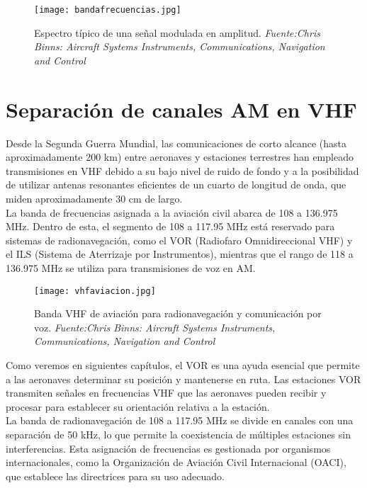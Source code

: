 \begin{figure}[H]
    \centering
    \texttt{[image: bandafrecuencias.jpg]}
    \caption{\centering Espectro típico de una señal modulada en amplitud. \textit{ Fuente:Chris Binns: Aircraft Systems Instruments, Communications, Navigation and Control}}
    \label{fig:bandafrec}
\end{figure}


\section{Separación de canales AM en VHF}

Desde la Segunda Guerra Mundial, las comunicaciones de corto alcance (hasta aproximadamente 200 km) entre aeronaves y estaciones terrestres han empleado transmisiones en VHF debido a su bajo nivel de ruido de fondo y a la posibilidad de utilizar antenas resonantes eficientes de un cuarto de longitud de onda, que miden aproximadamente 30 cm de largo. \\

La banda de frecuencias asignada a la aviación civil abarca de 108 a 136.975 MHz. Dentro de esta, el segmento de 108 a 117.95 MHz está reservado para sistemas de radionavegación, como el VOR (Radiofaro Omnidireccional VHF) y el ILS (Sistema de Aterrizaje por Instrumentos), mientras que el rango de 118 a 136.975 MHz se utiliza para transmisiones de voz en AM. \\

\begin{figure}[H]
    \centering
    \texttt{[image: vhfaviacion.jpg]}
    \caption{\centering Banda VHF de aviación para radionavegación y comunicación por voz. \textit{ Fuente:Chris Binns: Aircraft Systems Instruments, Communications, Navigation and Control}}
    \label{fig:chfavviacion}
\end{figure}

Como veremos en siguientes capítulos, el VOR es una ayuda esencial que permite a las aeronaves determinar su posición y mantenerse en ruta. Las estaciones VOR transmiten señales en frecuencias VHF que las aeronaves pueden recibir y procesar para establecer su orientación relativa a la estación. \\

La banda de radionavegación de 108 a 117.95 MHz se divide en canales con una separación de 50 kHz, lo que permite la coexistencia de múltiples estaciones sin interferencias. Esta asignación de frecuencias es gestionada por organismos internacionales, como la Organización de Aviación Civil Internacional (OACI), que establece las directrices para su uso adecuado. \\

